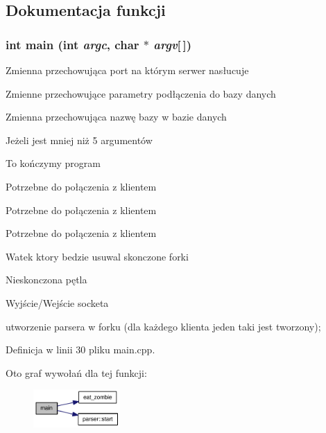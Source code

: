 \subsection{Dokumentacja funkcji}
\hypertarget{a00013_0ddf1224851353fc92bfbff6f499fa97}{
\subsubsection[{main}]{\setlength{\rightskip}{0pt plus 5cm}int main (int {\em argc}, \/  char $\ast$ {\em argv}\mbox{[}$\,$\mbox{]})}}
\label{d7/dd4/a00013_0ddf1224851353fc92bfbff6f499fa97}




Zmienna przechowująca port na którym serwer nasłucuje

Zmienne przechowujące parametry podłączenia do bazy danych

Zmienna przechowująca nazwę bazy w bazie danych

Jeżeli jest mniej niż 5 argumentów

To kończymy program

Potrzebne do połączenia z klientem

Potrzebne do połączenia z klientem

Potrzebne do połączenia z klientem

Watek ktory bedzie usuwal skonczone forki

Nieskonczona pętla

Wyjście/Wejście socketa

utworzenie parsera w forku (dla każdego klienta jeden taki jest tworzony); 

Definicja w linii 30 pliku main.cpp.

Oto graf wywołań dla tej funkcji:\nopagebreak
\begin{figure}[H]
\begin{center}
\leavevmode
\includegraphics[width=94pt]{d7/dd4/a00013_0ddf1224851353fc92bfbff6f499fa97_cgraph}
\end{center}
\end{figure}
